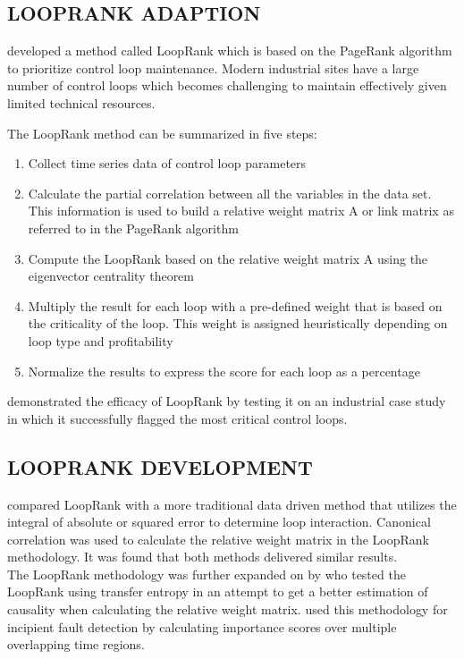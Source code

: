 \subsection{LOOPRANK ADAPTION}

\cite{farenzena2009looprank} developed a method called LoopRank which is based on the PageRank algorithm to prioritize control loop maintenance. Modern industrial sites have a large number of control loops which becomes challenging to maintain effectively given limited technical resources. 

The LoopRank method can be summarized in five steps:
\begin{enumerate}
	\item Collect time series data of control loop parameters
	\item Calculate the partial correlation between all the variables in the data set. This information is used to build a relative weight matrix A or link matrix as referred to in the PageRank algorithm
	\item Compute the LoopRank based on the relative weight matrix A using the eigenvector centrality theorem
	\item Multiply the result for each loop with a pre-defined weight that is based on the criticality of the loop. This weight is assigned heuristically depending on loop type and profitability
	\item Normalize the results to express the score for each loop as a percentage
\end{enumerate}

\cite{farenzena2009looprank} demonstrated the efficacy of LoopRank by testing it on an industrial case study in which it successfully flagged the most critical control loops.

\subsection{LOOPRANK DEVELOPMENT}

\cite{rahman2010new} compared LoopRank with a more traditional data driven method that utilizes the integral of absolute or squared error to determine loop interaction. Canonical correlation was used to calculate the relative weight matrix in the LoopRank methodology. It was found that both methods delivered similar results.\\ 
The LoopRank methodology was further expanded on by \cite{streicher2014eigenvector} who tested the LoopRank using transfer entropy in an attempt to get a better estimation of causality when calculating the relative weight matrix. \cite{streicher2019plant} used this methodology for incipient fault detection by calculating importance scores over multiple overlapping time regions. \\ 

